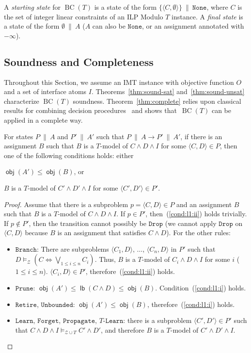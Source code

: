 \documentclass{llncs}
\newcommand\none[0]{\ensuremath{\mathtt{None}}}
\newcommand{\tr}[1]{\ensuremath{\mathtt{#1}}}
\newcommand{\ttr}[1]{\ensuremath{T\text{-}\mathtt{#1}}}
\newcommand{\state}[2]{\ensuremath{#1\ \|\ #2}}
\newcommand{\statenone}[1]{\state{#1}{\none}}
\newcommand{\subp}[2]{\ensuremath{\langle#1, #2\rangle}}
\newcommand{\Z}[0]{\ensuremath{\mathcal{Z}}}
\newcommand{\modelsz}[0]{\ensuremath{ \models_{\Z} }}
\newcommand{\modelszt}[0]{\ensuremath{ \models_{\Z \cup T} }}
\newcommand{\setsp}[2]{\ensuremath{\{ \subp{#1}{#2} \}}}
\newcommand{\trans}[0]{\ensuremath{ \longrightarrow }}
\newcommand{\cd}{\subp{C}{D}}
\newcommand{\cdprime}{\subp{C'}{D'}}
\newcommand{\pa}{\state{P}{A}}
\newcommand{\paprime}{\state{P'}{A'}}
\newcommand{\bct}[0]{\ensuremath{\operatorname{BC}(T)}}
\newcommand{\obj}[1]{\ensuremath{\operatorname{\mathsf{obj}}(#1)}}
\newcommand{\lb}[1]{\ensuremath{\operatorname{\mathsf{lb}}(#1)}}
\begin{document}
A \emph{starting state} for \bct{} is a state of the form
$\statenone{\setsp{C}{\emptyset}}$, where $C$ is the set of integer
linear constraints of an ILP Modulo $T$ instance. A \emph{final state}
is a state of the form \state{\emptyset}{A} ($A$ can also be \none{},
or an assignment annotated with $-\infty$).

\subsection{Soundness and Completeness}
\label{subsec:soundness}

Throughout this Section, we assume an IMT instance with objective
function $O$ and a set of interface atoms
$I$. Theorems~\ref{thm:sound-sat} and~\ref{thm:sound-unsat}
characterize \bct{} soundness. Theorem~\ref{thm:complete} relies upon
classical results for combining decision
procedures~\cite{no79,noproof,combiningdp} and shows that~\bct{} can
be applied in a complete way.

\begin{lemma}
  \label{lemma:l1}
  For states \pa{} and \paprime{} such that $\pa \trans \paprime$, if
  there is an assignment $B$ such that $B$ is a $T$-model of $C \wedge
  D \wedge I$ for some $\cd \in P$, then one of the following
  conditions holds: either
  \begin{inparaenum}[(i)]
  \item\label{cond:l1:i} $\obj{A'} \leq \obj{B}$, or
  \item\label{cond:l1:ii} $B$ is a $T$-model of $C' \wedge D' \wedge
    I$ for some $\cdprime \in P'$.
  \end{inparaenum}
\end{lemma}
\begin{proof}
  Assume that there is a subproblem $p = \cd \in P$ and an assignment
  $B$ such that $B$ is a $T$-model of $C \wedge D \wedge I$. If $p \in
  P'$, then~(\ref{cond:l1:ii}) holds trivially. If $p \notin P'$, then
  the transition cannot possibly be \tr{Drop} (we cannot apply
  \tr{Drop} on {\cd} because $B$ is an assignment that satisfies $C
  \wedge D$). For the other rules:
  \begin{itemize}
  \item \tr{Branch}: There are subproblems $\subp{C_1}{D}$, $\ldots$,
    $\subp{C_n}{D}$ in $P'$ such that $D \modelsz (C \Leftrightarrow
    \bigvee_{1 \leq i \leq n} C_i)$.  Thus, $B$ is a $T$-model of $C_i
    \wedge D \wedge I$ for some $i$ ($1 \leq i \leq
    n$). $\subp{C_i}{D} \in P'$, therefore~(\ref{cond:l1:ii}) holds.
  \item \tr{Prune}: $\obj{A'} \leq \lb{C \wedge D} \leq
    \obj{B}$. Condition~(\ref{cond:l1:i}) holds.
  \item \tr{Retire}, \tr{Unbounded}: $\obj{A'} \leq \obj{B}$,
    therefore~(\ref{cond:l1:i}) holds.
  \item \tr{Learn}, \tr{Forget}, \tr{Propagate}, \ttr{Learn}: there is
    a subproblem $\subp{C'}{D'} \in P'$ such that $C \wedge D \wedge I
    \modelszt C' \wedge D'$, and therefore $B$ is a $T$-model of $C'
    \wedge D' \wedge I$.
  \end{itemize}
\end{proof}
\end{document}
